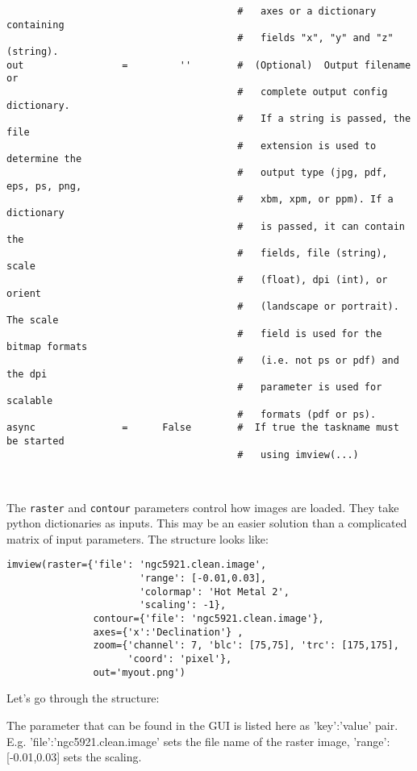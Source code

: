 \begin{verbatim}
                                        #   axes or a dictionary containing
                                        #   fields "x", "y" and "z" (string).
out                 =         ''        #  (Optional)  Output filename or
                                        #   complete output config dictionary.
                                        #   If a string is passed, the file
                                        #   extension is used to determine the
                                        #   output type (jpg, pdf, eps, ps, png,
                                        #   xbm, xpm, or ppm). If a dictionary
                                        #   is passed, it can contain the
                                        #   fields, file (string), scale
                                        #   (float), dpi (int), or orient
                                        #   (landscape or portrait). The scale
                                        #   field is used for the bitmap formats
                                        #   (i.e. not ps or pdf) and the dpi
                                        #   parameter is used for scalable
                                        #   formats (pdf or ps).
async               =      False        #  If true the taskname must be started
                                        #   using imview(...)



\end{verbatim}
\normalsize

The {\tt raster} and {\tt contour} parameters control how images are
loaded. They take python dictionaries as inputs. This may be an easier
solution than a complicated matrix of input parameters. The structure
looks like:

\small
\begin{verbatim}
imview(raster={'file': 'ngc5921.clean.image',
                       'range': [-0.01,0.03],
                       'colormap': 'Hot Metal 2',
                       'scaling': -1},
               contour={'file': 'ngc5921.clean.image'},
               axes={'x':'Declination'} ,
               zoom={'channel': 7, 'blc': [75,75], 'trc': [175,175],
                     'coord': 'pixel'},
               out='myout.png')
\end{verbatim}
\normalsize

Let's go through the structure: 

The parameter that can be found in the GUI is listed here as 'key':'value'
pair. E.g. 'file':'ngc5921.clean.image' sets the file name of the
raster image, 'range': [-0.01,0.03] sets the scaling. 

